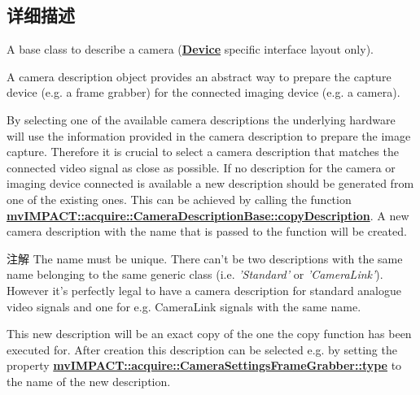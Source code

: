 \subsection{详细描述}
A base class to describe a camera ({\bfseries \hyperlink{classmv_i_m_p_a_c_t_1_1acquire_1_1_device}{Device}} specific interface layout only). 

A camera description object provides an abstract way to prepare the capture device (e.\+g. a frame grabber) for the connected imaging device (e.\+g. a camera).

By selecting one of the available camera descriptions the underlying hardware will use the information provided in the camera description to prepare the image capture. Therefore it is crucial to select a camera description that matches the connected video signal as close as possible. If no description for the camera or imaging device connected is available a new description should be generated from one of the existing ones. This can be achieved by calling the function {\bfseries \hyperlink{classmv_i_m_p_a_c_t_1_1acquire_1_1_camera_description_base_ab449bcb1f45d79f311728d22b4e60369}{mv\+I\+M\+P\+A\+C\+T\+::acquire\+::\+Camera\+Description\+Base\+::copy\+Description}}. A new camera description with the name that is passed to the function will be created.

\begin{DoxyNote}{注解}
The name must be unique. There can't be two descriptions with the same name belonging to the same generic class (i.\+e. {\itshape 'Standard'} or {\itshape 'Camera\+Link'\textregistered{}}). However it's perfectly legal to have a camera description for standard analogue video signals and one for e.\+g. Camera\+Link\textregistered{} signals with the same name.
\end{DoxyNote}
This new description will be an exact copy of the one the copy function has been executed for. After creation this description can be selected e.\+g. by setting the property {\bfseries \hyperlink{classmv_i_m_p_a_c_t_1_1acquire_1_1_camera_settings_frame_grabber_a3cf5c97b03127b143d79619658e2edb9}{mv\+I\+M\+P\+A\+C\+T\+::acquire\+::\+Camera\+Settings\+Frame\+Grabber\+::type}} to the name of the new description.

